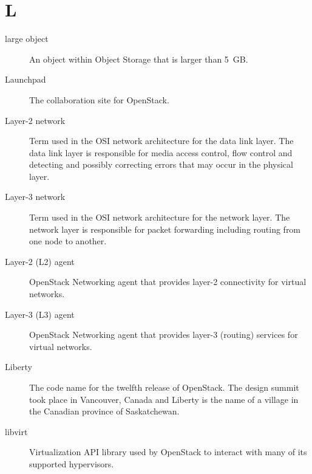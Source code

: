 \documentclass[letterpaper,10pt,english]{sphinxmanual}
\begin{document}
\section{L}
\label{_source/glossary:l}\begin{description}
\item[{large object}] \leavevmode{}\label{_source/glossary:term-large-object}
An object within Object Storage that is larger than 5 GB.

\item[{Launchpad}] \leavevmode{}\label{_source/glossary:term-launchpad}
The collaboration site for OpenStack.

\item[{Layer-2 network}] \leavevmode{}\label{_source/glossary:term-layer-2-network}
Term used in the OSI network architecture for the data link
layer. The data link layer is responsible for media access
control, flow control and detecting and possibly correcting
errors that may occur in the physical layer.

\item[{Layer-3 network}] \leavevmode{}\label{_source/glossary:term-layer-3-network}
Term used in the OSI network architecture for the network
layer. The network layer is responsible for packet
forwarding including routing from one node to another.

\item[{Layer-2 (L2) agent}] \leavevmode{}\label{_source/glossary:term-layer-2-l2-agent}
OpenStack Networking agent that provides layer-2
connectivity for virtual networks.

\item[{Layer-3 (L3) agent}] \leavevmode{}\label{_source/glossary:term-layer-3-l3-agent}
OpenStack Networking agent that provides layer-3
(routing) services for virtual networks.

\item[{Liberty}] \leavevmode{}\label{_source/glossary:term-liberty}
The code name for the twelfth release of OpenStack. The
design summit took place in Vancouver, Canada and Liberty is
the name of a village in the Canadian province of
Saskatchewan.

\item[{libvirt}] \leavevmode{}\label{_source/glossary:term-libvirt}
Virtualization API library used by OpenStack to interact with
many of its supported hypervisors.


\end{description}
\end{document}
